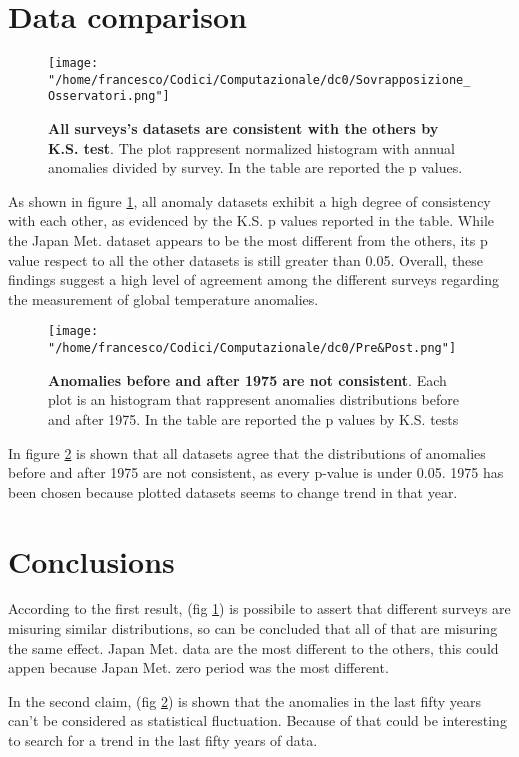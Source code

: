 \documentclass[a4paper,11pt,rmp,superscriptaddress]{revtex4}
\begin{document}
\section*{Data comparison}
\begin{figure}[h!]
    \centering
    \texttt{[image: "/home/francesco/Codici/Computazionale/dc0/Sovrapposizione\_Osservatori.png"]}
    \caption[short]{\textbf{All surveys's datasets are consistent with the others by K.S. test}. The plot rappresent normalized histogram with 
    annual anomalies divided by survey. In the table are reported the p values.} 
    \label{fig:1}
\end{figure}
As shown in figure \ref*{fig:1}, all anomaly datasets exhibit a high degree of consistency with each other, 
as evidenced by the K.S. p values reported in the table. 
While the Japan Met. dataset appears to be the most different from the others, 
its p value respect to all the other datasets is still greater than 0.05. 
Overall, these findings suggest a high level of agreement among the different surveys 
regarding the measurement of global temperature anomalies.

\begin{figure}[h!]
    \centering
    \texttt{[image: "/home/francesco/Codici/Computazionale/dc0/Pre\&Post.png"]}
    \caption[short]{\textbf{Anomalies before and after 1975 are not consistent}. Each plot is an histogram that 
    rappresent anomalies distributions before and after 1975. In the table are reported the p values by K.S. tests}
    \label{fig:2}
\end{figure}
In figure \ref*{fig:2} is shown that all datasets agree that the distributions of anomalies before and after 1975 are not consistent, 
as every p-value is under 0.05. 1975 has been chosen because plotted datasets seems to change trend in that year.


\section*{Conclusions}
According to the first result, (fig \ref*{fig:1}) is possibile to assert that different surveys are misuring similar distributions,
so can be concluded that all of that are misuring the same effect. Japan Met. data are the most different to the others, this could 
appen because Japan Met. zero period was the most different. 

In the second claim, (fig \ref*{fig:2}) is shown that the anomalies in the last fifty years can't be considered as statistical fluctuation.
Because of that could be interesting to search for a trend in the last fifty years of data.
\end{document}

